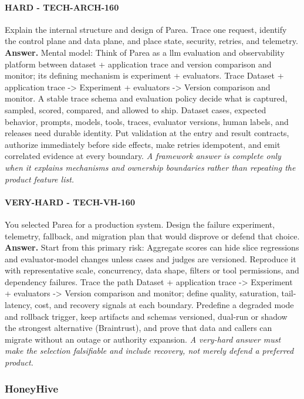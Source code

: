 \paragraph{HARD - TECH-ARCH-160} Explain the internal structure and design of Parea. Trace one request, identify the control plane and data plane, and place state, security, retries, and telemetry.
\textbf{Answer.} Mental model: Think of Parea as a llm evaluation and observability platform between dataset + application trace and version comparison and monitor; its defining mechanism is experiment + evaluators. Trace Dataset + application trace -> Experiment + evaluators -> Version comparison and monitor. A stable trace schema and evaluation policy decide what is captured, sampled, scored, compared, and allowed to ship. Dataset cases, expected behavior, prompts, models, tools, traces, evaluator versions, human labels, and releases need durable identity. Put validation at the entry and result contracts, authorize immediately before side effects, make retries idempotent, and emit correlated evidence at every boundary.
\textit{A framework answer is complete only when it explains mechanisms and ownership boundaries rather than repeating the product feature list.}
\paragraph{VERY-HARD - TECH-VH-160} You selected Parea for a production system. Design the failure experiment, telemetry, fallback, and migration plan that would disprove or defend that choice.
\textbf{Answer.} Start from this primary risk: Aggregate scores can hide slice regressions and evaluator-model changes unless cases and judges are versioned. Reproduce it with representative scale, concurrency, data shape, filters or tool permissions, and dependency failures. Trace the path Dataset + application trace -> Experiment + evaluators -> Version comparison and monitor; define quality, saturation, tail-latency, cost, and recovery signals at each boundary. Predefine a degraded mode and rollback trigger, keep artifacts and schemas versioned, dual-run or shadow the strongest alternative (Braintrust), and prove that data and callers can migrate without an outage or authority expansion.
\textit{A very-hard answer must make the selection falsifiable and include recovery, not merely defend a preferred product.}
\subsubsection*{HoneyHive}
